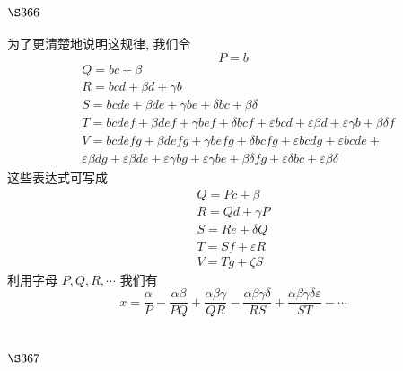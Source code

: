 \section{$\S 366$}

为了更清楚地说明这规律, 我们令
\[
P=b
\]
\[
\begin{aligned}
& Q=b c+\beta \\
& R=b c d+\beta d+\gamma b \\
& S=b c d e+\beta d e+\gamma b e+\delta b c+\beta \delta \\
& T=b c d e f+\beta d e f+\gamma b e f+\delta b c f+\varepsilon b c d+\varepsilon \beta d+\varepsilon \gamma b+\beta \delta f \\
& V=b c d e f g+\beta d e f g+\gamma b e f g+\delta b c f g+\varepsilon b c d g+\varepsilon b c d e+ \\
& \varepsilon \beta d g+\varepsilon \beta d e+\varepsilon \gamma b g+\varepsilon \gamma b e+\beta \delta f g+\varepsilon \delta b c+\varepsilon \beta \delta
\end{aligned}
\]
这些表达式可写成
\[
\begin{gathered}
Q=P c+\beta \\
R=Q d+\gamma P \\
S=R e+\delta Q \\
T=S f+\varepsilon R \\
V=T g+\zeta S
\end{gathered}
\]
利用字母 $P, Q, R, \cdots$ 我们有
\[
x=\frac{\alpha}{P}-\frac{\alpha \beta}{P Q}+\frac{\alpha \beta \gamma}{Q R}-\frac{\alpha \beta \gamma \delta}{R S}+\frac{\alpha \beta \gamma \delta \varepsilon}{S T}-\cdots
\]
\section{$\S 367$}

